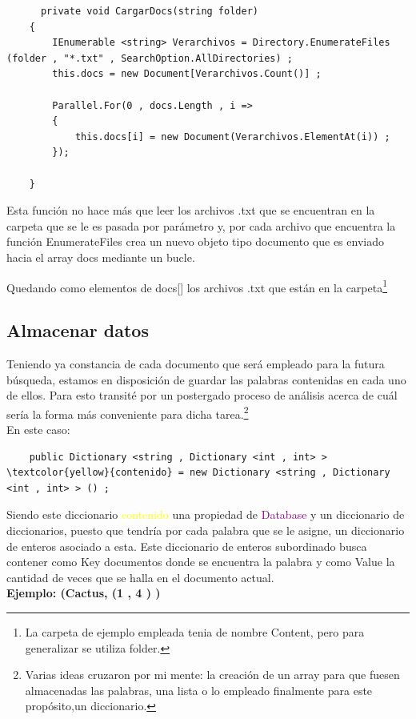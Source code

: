 \documentclass{article}
\begin{document}
\begin{lstlisting}
      private void CargarDocs(string folder)
    {
        IEnumerable <string> Verarchivos = Directory.EnumerateFiles (folder , "*.txt" , SearchOption.AllDirectories) ;
        this.docs = new Document[Verarchivos.Count()] ;
       
        Parallel.For(0 , docs.Length , i => 
        {
            this.docs[i] = new Document(Verarchivos.ElementAt(i)) ;           
        });

    }
\end{lstlisting}

Esta función no hace más que leer los archivos .txt que se encuentran en la carpeta que se le es pasada por parámetro y, por cada 
archivo que encuentra la función \textcolor{green!40!black}{EnumerateFiles} crea un nuevo objeto tipo documento que es enviado hacia el array docs mediante un bucle.

Quedando como elementos de docs[] los archivos .txt que están en la carpeta\footnote{La carpeta de ejemplo empleada tenia de nombre Content, pero para generalizar se utiliza folder.} 

\subsection{Almacenar datos}
Teniendo ya constancia de cada documento que será empleado para la futura búsqueda, estamos en disposición de guardar las palabras contenidas en cada uno de ellos. Para esto transité por un 
postergado proceso de análisis acerca de cuál sería la forma más conveniente para dicha tarea.\footnote{Varias ideas cruzaron por mi mente: la creación de un array para que fuesen almacenadas las palabras, una lista o lo empleado finalmente para este propósito,un diccionario. }
\\En este caso:\\
\begin{lstlisting}
    public Dictionary <string , Dictionary <int , int> > \textcolor{yellow}{contenido} = new Dictionary <string , Dictionary <int , int> > () ;  

\end{lstlisting}

Siendo este diccionario \textcolor{yellow!80!black}{\textcolor{yellow}{contenido}} una propiedad de \textcolor{purple}{Database} y un diccionario de diccionarios, puesto que tendría por cada palabra que se le asigne, un diccionario de enteros asociado a esta. Este diccionario de enteros subordinado busca contener como Key documentos donde se encuentra la palabra y como Value la cantidad de veces que se halla en el documento actual.\\
\textbf{Ejemplo: (Cactus, (1 , 4 ) ) }\\
\end{document}
